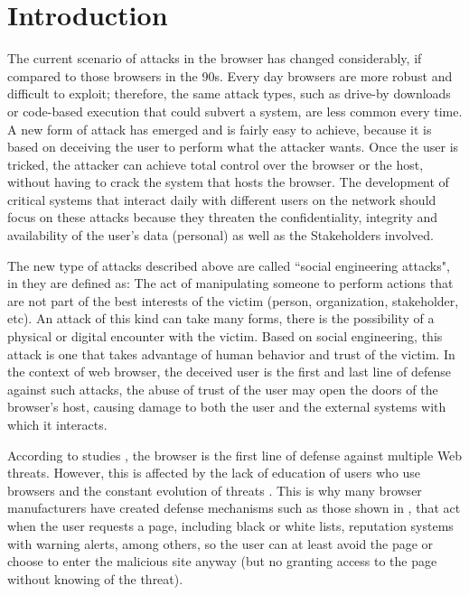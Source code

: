 \documentclass{sig-alternate-05-2015}
\begin{document}





\section{Introduction}
The current scenario of attacks in the browser has changed considerably, if compared to those browsers in the 90s. Every day browsers are more robust and difficult to exploit; therefore, the same attack types, such as drive-by downloads or code-based execution that could subvert a system, are less common every time. A new form of attack has emerged and is fairly easy to achieve, because it is based on deceiving the user to perform what the attacker wants. Once the user is tricked, the attacker can achieve total control over the browser or the host, without having to crack the system \cite{Rajab2013,Labs2013} that hosts the browser. The development of critical systems that interact daily with different users on the network should focus on these attacks because they threaten the confidentiality, integrity and availability of the user's data (personal) as well as the Stakeholders involved.

The new type of attacks described above are called ``social engineering attacks", in \cite{socEngineeering} they are defined as: The act of manipulating someone to perform actions that are not part of the best interests of the victim (person, organization, stakeholder, etc). An attack of this kind can take many forms, there is the possibility of a physical or digital encounter with the victim. Based on social engineering, this attack is one that takes advantage of human behavior and trust of the victim. In the context of web browser, the deceived user is the first and last line of defense against such attacks, the abuse of trust of the user may open the doors of the browser's host, causing damage to both the user and the external systems with which it interacts.

According to studies \cite{browSecPhish,Labs2013,rowSecSEMBlock}, the browser is the first line of defense against multiple Web threats. However, this is affected by the lack of education of users who use browsers and the constant evolution of threats \cite{browSecPhish}. This is why many browser manufacturers have created defense mechanisms such as those shown in \cite{Drake2011}, that act when the user requests a page, including black or white lists, reputation systems \cite{Rajab2013} with warning alerts, among others, so the user can at least avoid the page or choose to enter the malicious site anyway (but no granting access to the page without knowing of the threat).
\end{document}
